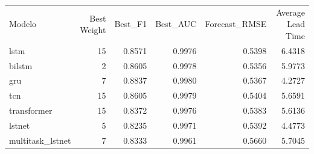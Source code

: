 \begin{tabular}{lrrrrr}
Modelo & Best Weight & Best_F1 & Best_AUC & Forecast_RMSE & Average Lead Time \\
lstm & 15 & 0.8571 & 0.9976 & 0.5398 & 6.4318 \\
bilstm & 2 & 0.8605 & 0.9978 & 0.5356 & 5.9773 \\
gru & 7 & 0.8837 & 0.9980 & 0.5367 & 4.2727 \\
tcn & 15 & 0.8605 & 0.9979 & 0.5404 & 5.6591 \\
transformer & 15 & 0.8372 & 0.9976 & 0.5383 & 5.6136 \\
lstnet & 5 & 0.8235 & 0.9971 & 0.5392 & 4.4773 \\
multitask_lstnet & 7 & 0.8333 & 0.9961 & 0.5660 & 5.7045 \\
\end{tabular}
